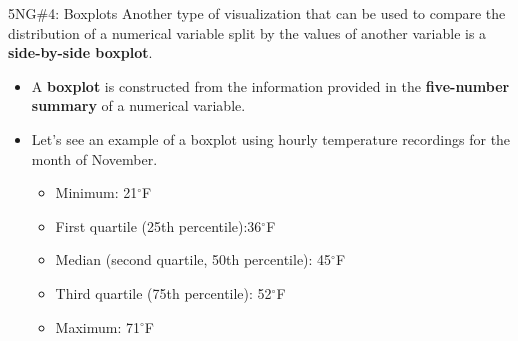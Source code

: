 \documentclass[
  ignorenonframetext,
]{beamer}
\providecommand{\tightlist}{%
  \setlength{\itemsep}{0pt}\setlength{\parskip}{0pt}}
\begin{document}
\begin{frame}{5NG\#4: Boxplots}
\protect\hypertarget{ng4-boxplots}{}
Another type of visualization that can be used to compare the
distribution of a numerical variable split by the values of another
variable is a \textbf{side-by-side boxplot}.

\begin{itemize}
\item
  A \textbf{boxplot} is constructed from the information provided in the
  \textbf{five-number summary} of a numerical variable.
\item
  Let's see an example of a boxplot using hourly temperature recordings
  for the month of November.

  \begin{itemize}
  \tightlist
  \item
    Minimum: 21\(^{\circ}\)F
  \item
    First quartile (25th percentile):36\(^{\circ}\)F
  \item
    Median (second quartile, 50th percentile): 45\(^{\circ}\)F
  \item
    Third quartile (75th percentile): 52\(^{\circ}\)F
  \item
    Maximum: 71\(^{\circ}\)F
  \end{itemize}
\end{itemize}
\end{frame}
\end{document}
